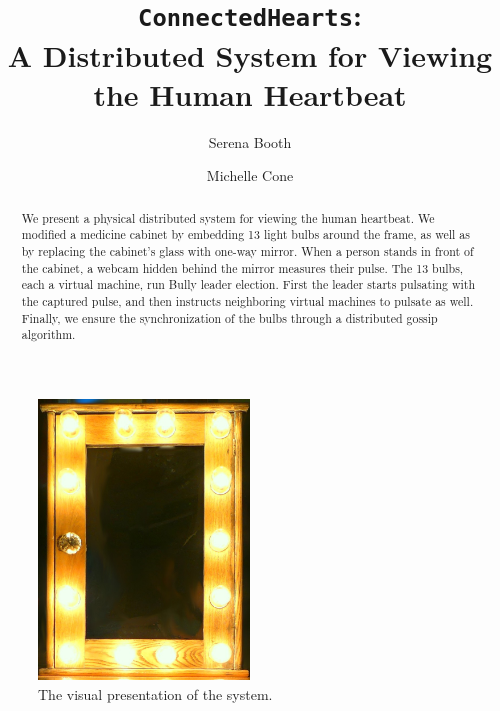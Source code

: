 \documentclass[preprint,review,12pt]{cs262}
\begin{document}
\begin{frontmatter}

\title{\texttt{ConnectedHearts}: \\ A Distributed System for Viewing the Human Heartbeat}

\author[label1, label0]{Serena Booth}
\address[label1]{sbooth@college.harvard.edu}


\author[label2, label0]{Michelle Cone}
\address[label2]{mcone@college.harvard.edu}



\begin{abstract}
We present a physical distributed system for viewing the human heartbeat. We modified a medicine cabinet by embedding 13 light bulbs around the frame, as well as by replacing the cabinet's glass with one-way mirror. When a person stands in front of the cabinet, a webcam hidden behind the mirror measures their pulse. The 13 bulbs, each a virtual machine, run Bully leader election. First the leader starts pulsating with the captured pulse, and then instructs neighboring virtual machines to pulsate as well. Finally, we ensure the synchronization of the bulbs through a distributed gossip algorithm.
\end{abstract}


\end{frontmatter}





\begin{figure}[h]
  \centering
  \includegraphics[width=0.5\textwidth]{figures/bulbs.JPG}
  \caption{The visual presentation of the system. 
 \label{fig:layout}}
\end{figure}
\end{document}
